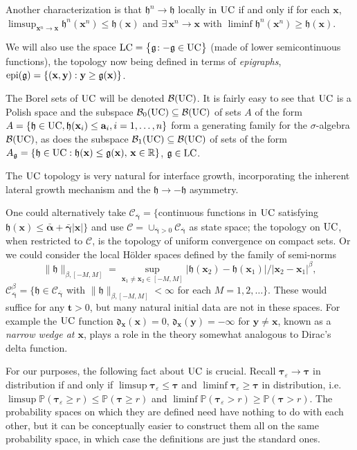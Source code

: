\documentclass[letterpaper,reqno,11pt,oneside,final]{amsart}
\theoremstyle{definition}
\newcommand{\fh}{\mathfrak{h}}
\newcommand{\fg}{\mathfrak{g}}
\newcommand{\pp}{\mathbb{P}}
\newcommand{\rr}{\mathbb{R}}
\newcommand{\ep}{\varepsilon}
\newcommand{\uptext}[1]{\text{\upshape{#1}}}
\DeclareMathOperator{\epi}{\uptext{epi}}
\DeclareMathOperator{\UC}{\uptext{UC}}
\DeclareMathOperator{\LC}{\uptext{LC}}
\newcommand{\ft}{\mathbf{t}}
\newcommand{\fx}{\mathbf{x}}
\newcommand{\fy}{\mathbf{y}}
\newcommand{\fa}{\mathbf{a}}
\newcommand{\ftau}{\bm{\tau}}
\newcommand{\gga}{\bar{\bm{\alpha}}}
\newcommand{\g}{\bar{\bm{\gamma}}}
\numberwithin{equation}{section}
\begin{document}
Another characterization is that
$\fh^n\to \fh$ locally in $\UC$ if and only if for each $\fx$, $\limsup_{\fx^n\to\fx} \fh^n(\fx^n) \le \fh(\fx)$ and $\exists\,\fx^n\to\fx$ with $\liminf \fh^n(\fx^n)\ge  \fh(\fx)$. 

We will also use the space $\LC=\big\{\fg\!: -\fg\in\UC\!\big\}$ (made of lower semicontinuous functions), the topology now being defined in terms of \emph{epigraphs}, $\epi(\fg) = \{(\fx,\fy): \fy\ge \fg(\fx)\}$.

The Borel sets of $\UC$ will be denoted $\mathcal{B}(\UC)$.
It is fairly easy to see that  $\UC$ is a Polish space and the subspace $\mathcal{B}_0(\UC)\subseteq\mathcal{B}(\UC)$  of sets $A$ of the form $A=\{\fh\in \UC, \fh(\fx_i)\le \fa_i, i=1,\ldots,n\}$ form a generating family for the $\sigma$-algebra $\mathcal{B}(\UC)$, as does the subspace $\mathcal{B}_1(\UC)\subseteq\mathcal{B}(\UC)$  of sets of the form $A_{\mathfrak{g}} = \{ \fh\in \UC:  \fh(\fx) \le \fg(\fx),\,\fx\in\rr\}$, $\fg\in\LC$.

The  $\UC$ topology is very natural for interface growth, incorporating the inherent lateral growth mechanism and the $\fh\to-\fh$ asymmetry.

One could alternatively take ${\mathscr{C}}_{\g}= \{$continuous functions in $\UC$ satisfying $\fh(\fx)\le \gga + \g |\fx|\}$ and use $\mathscr{C}=\cup_{\g>0}\mathscr{C}_{\g}$ as state space; the topology on $\UC$, when restricted to $\mathscr C$, is the topology of uniform convergence on compact sets.
Or we could consider the local H\"older spaces defined by the family of semi-norms
\begin{equation}\label{eq:defHolderNorm}
\| \fh \|_{\beta, [-M,M]} = \sup_{\fx_1\neq \fx_2 \in [-M,M]} 
{ |\fh(\fx_2)-\fh(\fx_1)|}/{|\fx_2-\fx_1|^\beta},
\end{equation}
${\mathscr{C}}^\beta_{\g}=\{ \fh\in {\mathscr{C}}_{\g}$ with $\| \fh \|_{\beta, [-M,M]} <\infty$ for each $M=1,2,\ldots\}$.
These would suffice for any $\ft>0$, but many natural initial data are not in these spaces.  
For example the $\UC$ function $\mathfrak{d}_\fx(\fx) = 0$, $\mathfrak{d}_\fx(\fy) = -\infty$ for $\fy\neq \fx$, known as a {\em narrow wedge at $\fx$}, plays a role in the theory somewhat analogous to Dirac's delta function.

For our purposes, the following fact about $\UC$ is crucial.  Recall $\ftau_\ep\longrightarrow \ftau$ in distribution if and only if $\limsup \ftau_\ep \le \ftau$ and $\liminf \ftau_\ep \ge \ftau$ in distribution, i.e. $\limsup \pp( \ftau_\ep\ge r) \le \pp(\ftau\ge r)$ and $\liminf \pp( \ftau_\ep> r)
\ge \pp(\ftau> r)$. 
The probability spaces on which they are defined need have nothing to do with each other, but it can be conceptually easier
to construct them all on the same probability space, in which case the definitions are just the standard ones.
\end{document}
